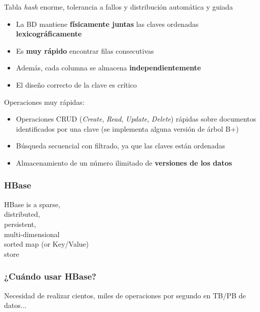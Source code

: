 \documentclass[14pt]{beamer}
\begin{document}
\begin{frame}
\begin{itemize}
\begin{frame}[allowframebreaks]
\framebreak

 Tabla {\em hash\/} enorme, tolerancia a fallos y distribución
  automática y guiada
  \begin{itemize}
  \item La BD mantiene {\bf físicamente juntas} las claves ordenadas {\bf
      lexicográficamente}
  \item Es {\bf muy rápido} encontrar filas consecutivas
  \item Además, cada columna se almacena {\bf independientemente}
  \item El diseño correcto de la clave es {\color{red} crítico}
  \end{itemize}

\framebreak

 Operaciones muy rápidas:
  \begin{itemize}
  \item Operaciones CRUD ({\em Create}, {\em Read}, {\em Update}, {\em
      Delete}) rápidas sobre documentos identificados por una clave (se
    implementa alguna versión de árbol B+)
\item Búsqueda secuencial con filtrado, ya que las claves están ordenadas
\item Almacenamiento de un número ilimitado de {\bf versiones de los datos}
  \end{itemize}

\end{frame}

\begin{frame}
  \frametitle{HBase}
  \begin{block}{}
    {\Large  HBase is a {\color{red} sparse},\\ {\color{green} distributed},\\
      {\color{blue} persistent},\\ {\color{red} multi-dimensional} \\
      {\color{green} sorted map} (or Key/Value) \\ {\color{blue} store}}
  \end{block}
\end{frame}

\begin{frame}
  \frametitle{¿Cuándo usar HBase?}

  \begin{block}{}
    Necesidad de realizar cientos, miles de operaciones por segundo en
    TB/PB de datos...
  \end{block}


\end{frame}
\end{itemize}
\end{frame}
\end{document}
